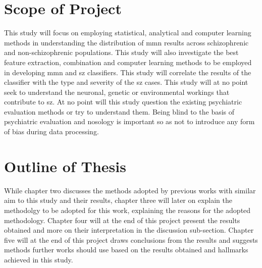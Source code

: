 \section{Scope of Project}\label{sec:projectScope}
This study will focus on employing statistical, analytical and computer learning methods in understanding the distribution of \ac{mmn} results across schizophrenic and non-schizophrenic populations.
This study will also investigate the best feature extraction, combination and computer learning methods to be employed in developing \ac{mmn} and \ac{sz} classifiers. 
This study will correlate the results of the classifier with the type and severity of the \ac{sz} cases.
This study will at no point seek to understand the neuronal, genetic or environmental workings that contribute to \ac{sz}.
At no point will this study question the existing psychiatric evaluation methods or try to understand them. Being blind to the basis of psychiatric evaluation and nosology is important so as not to introduce any form of bias during data processing.

\section{Outline of Thesis}\label{sec:reportOutline}
While chapter two discusses the methods adopted by previous works with similar aim to this study and their results, 
chapter three will later on explain the methodolgy to be adopted for this work, explaining the reasons for the adopted 
methodology. Chapter four will at the end of this project present the results obtained and more on their interpretation in the discussion sub-section. 
Chapter five will at the end of this project draws conclusions from the results and suggests methods further works should use based on 
the results obtained and hallmarks achieved in this study.



